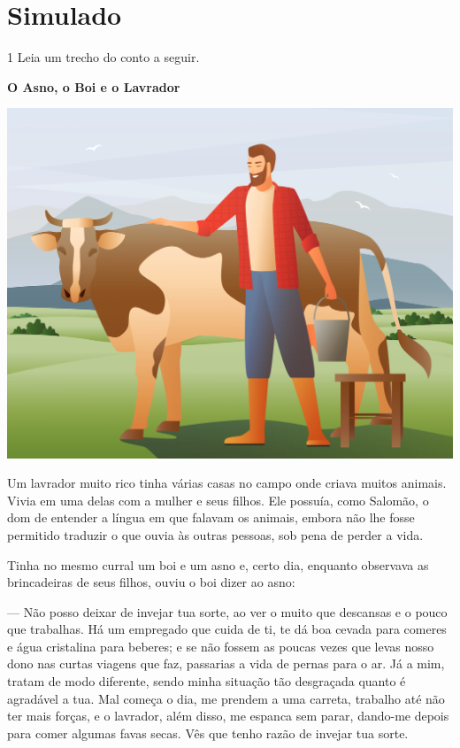 \chapter[Simulado 4]{Simulado}

\num{1} Leia um trecho do conto a seguir.

\begin{myquote}
\textbf{O Asno, o Boi e o Lavrador}

\begin{center}
\includegraphics[width=.8\textwidth]{media/image50.jpeg}
\end{center}

Um lavrador muito rico tinha várias casas no campo onde criava muitos
animais. Vivia em uma delas com a mulher e seus filhos. Ele possuía,
como Salomão, o dom de entender a língua em que falavam os animais,
embora não lhe fosse permitido traduzir o que ouvia às outras pessoas,
sob pena de perder a vida.

Tinha no mesmo curral um boi e um asno e, certo dia, enquanto observava
as brincadeiras de seus filhos, ouviu o boi dizer ao asno:

--- Não posso deixar de invejar tua sorte, ao ver o muito que descansas e
o pouco que trabalhas. Há um empregado que cuida de ti, te dá boa cevada
para comeres e água cristalina para beberes; e se não fossem as poucas
vezes que levas nosso dono nas curtas viagens que faz, passarias a vida
de pernas para o ar. Já a mim, tratam de modo diferente, sendo minha
situação tão desgraçada quanto é agradável a tua. Mal começa o dia, me
prendem a uma carreta, trabalho até não ter mais forças, e o lavrador,
além disso, me espanca sem parar, dando-me depois para comer algumas
favas secas. Vês que tenho razão de invejar tua sorte.

\end{myquote}


